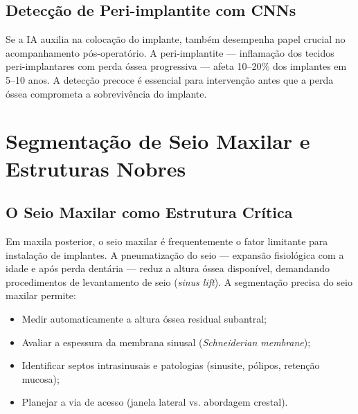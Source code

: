 \subsection{Detecção de Peri-implantite com CNNs}

Se a IA auxilia na colocação do implante, também desempenha papel crucial no acompanhamento pós-operatório. A peri-implantite --- inflamação dos tecidos peri-implantares com perda óssea progressiva --- afeta 10--20\% dos implantes em 5--10 anos. A detecção precoce é essencial para intervenção antes que a perda óssea comprometa a sobrevivência do implante.


\section{Segmentação de Seio Maxilar e Estruturas Nobres}

\subsection{O Seio Maxilar como Estrutura Crítica}

Em maxila posterior, o seio maxilar é frequentemente o fator limitante para instalação de implantes. A pneumatização do seio --- expansão fisiológica com a idade e após perda dentária --- reduz a altura óssea disponível, demandando procedimentos de levantamento de seio (\textit{sinus lift}). A segmentação precisa do seio maxilar permite:
\begin{itemize}
    \item Medir automaticamente a altura óssea residual subantral;
    \item Avaliar a espessura da membrana sinusal (\textit{Schneiderian membrane});
    \item Identificar septos intrasinusais e patologias (sinusite, pólipos, retenção mucosa);
    \item Planejar a via de acesso (janela lateral vs. abordagem crestal).
\end{itemize}


